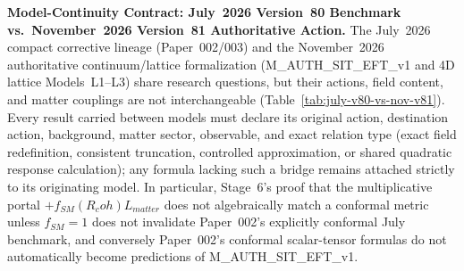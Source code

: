 \documentclass[american,11pt,letterpaper]{article}
\newcommand{\Rcoh}{R_{\mathrm{coh}}}
\def\mathcal#1{#1}%
\def\mathrm#1{#1}%
\def\texttt#1{#1}%
\def\emph#1{#1}%
\def\Rcoh{R_coh}%
\begin{document}
\textbf{Model-Continuity Contract: July~2026 Version~80 Benchmark vs.\ November~2026 Version~81 Authoritative Action.} The July~2026 compact corrective lineage (Paper~002/003) and the November~2026 authoritative continuum/lattice formalization (\texttt{M\_AUTH\_SIT\_EFT\_v1} and 4D lattice Models~L1--L3) share research questions, but their actions, field content, and matter couplings are \emph{not} interchangeable (Table~\ref{tab:july-v80-vs-nov-v81}). Every result carried between models must declare its original action, destination action, background, matter sector, observable, and exact relation type (exact field redefinition, consistent truncation, controlled approximation, or shared quadratic response calculation); any formula lacking such a bridge remains attached strictly to its originating model. In particular, Stage~6's proof that the multiplicative portal $+f_{\mathrm{SM}}(\Rcoh)\mathcal{L}_{\mathrm{matter}}$ does not algebraically match a conformal metric unless $f_{\mathrm{SM}} = 1$ does \emph{not} invalidate Paper~002's explicitly conformal July benchmark, and conversely Paper~002's conformal scalar-tensor formulas do \emph{not} automatically become predictions of \texttt{M\_AUTH\_SIT\_EFT\_v1}.
\end{document}
